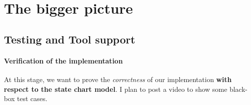 \documentclass[12pt,a4paper]{scrartcl}
\begin{document}
		
%		
%		
%		
%		
%		
%		
		




\section{The bigger picture}
\subsection{Testing and Tool support} \label{sec:testing}
	\paragraph{Verification of the implementation}
	At this stage, we want to prove the \textit{correctness} of our implementation \textbf{with respect to the state chart model}. 
	I plan to post a video to show some black-box test cases.
	
\end{document}
